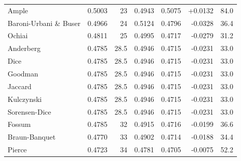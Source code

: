 \begin{table}[t]
{\begin{tabular}{lrrrrrr}
Ample & 0.5003 & 23 & 0.4943 & 0.5075 & +0.0132 & 84.0 \\
Baroni-Urbani \& Buser & 0.4966 & 24 & 0.5124 & 0.4796 & -0.0328 & 36.4 \\
Ochiai & 0.4811 & 25 & 0.4995 & 0.4717 & -0.0279 & 31.2 \\
Anderberg & 0.4785 & 28.5 & 0.4946 & 0.4715 & -0.0231 & 33.0 \\
Dice & 0.4785 & 28.5 & 0.4946 & 0.4715 & -0.0231 & 33.0 \\
Goodman & 0.4785 & 28.5 & 0.4946 & 0.4715 & -0.0231 & 33.0 \\
Jaccard & 0.4785 & 28.5 & 0.4946 & 0.4715 & -0.0231 & 33.0 \\
Kulczynski & 0.4785 & 28.5 & 0.4946 & 0.4715 & -0.0231 & 33.0 \\
Sorensen-Dice & 0.4785 & 28.5 & 0.4946 & 0.4715 & -0.0231 & 33.0 \\
Fossum & 0.4785 & 32 & 0.4915 & 0.4716 & -0.0199 & 36.6 \\
Braun-Banquet & 0.4770 & 33 & 0.4902 & 0.4714 & -0.0188 & 34.4 \\
Pierce & 0.4723 & 34 & 0.4781 & 0.4705 & -0.0075 & 52.2 \\
\bottomrule
\end{tabular}
}
\end{table}

